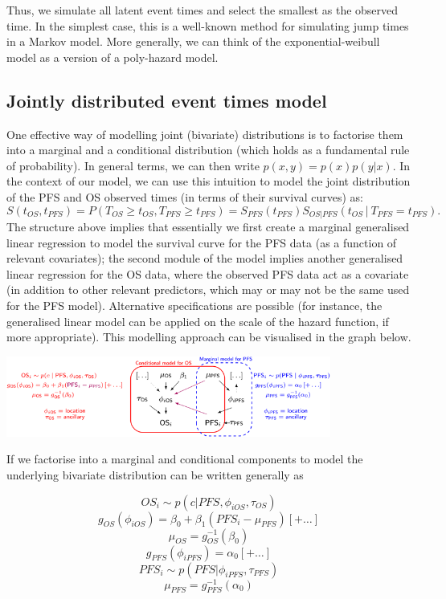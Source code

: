 \documentclass[
]{article}
\begin{document}
Thus, we simulate all latent event times and select the smallest as the
observed time. In the simplest case, this is a well-known method for
simulating jump times in a Markov model. More generally, we can think of
the exponential-weibull model as a version of a poly-hazard model.

\hypertarget{jointly-distributed-event-times-model}{%
\subsection{Jointly distributed event times
model}\label{jointly-distributed-event-times-model}}

One effective way of modelling joint (bivariate) distributions is to
factorise them into a marginal and a conditional distribution (which
holds as a fundamental rule of probability). In general terms, we can
then write \(p(x,y) = p(x)p(y | x)\). In the context of our model, we
can use this intuition to model the joint distribution of the PFS and OS
observed times (in terms of their survival curves) as: \[
S(t_{OS},t_{PFS}) = P⁡(T_{OS} \geq t_{OS}, T_{PFS} \geq t_{PFS})
= S_{PFS} (t_{PFS}) S_{OS|PFS}(t_{OS}│T_{PFS} = t_{PFS}).
\] The structure above implies that essentially we first create a
marginal generalised linear regression to model the survival curve for
the PFS data (as a function of relevant covariates); the second module
of the model implies another generalised linear regression for the OS
data, where the observed PFS data act as a covariate (in addition to
other relevant predictors, which may or may not be the same used for the
PFS model). Alternative specifications are possible (for instance, the
generalised linear model can be applied on the scale of the hazard
function, if more appropriate). This modelling approach can be
visualised in the graph below.

\includegraphics[width=0.8\textwidth,height=\textheight]{DAG.png}

If we factorise into a marginal and conditional components to model the
underlying bivariate distribution can be written generally as

\[
OS_i \sim p(c | PFS, \phi_{iOS}, \tau_{OS})
\] \[
g_{OS}(\phi_{iOS}) = \beta_0 + \beta_1 (PFS_i - \mu_{PFS})[+ \ldots]
\] \[
\mu_{OS} = g_{OS}^{-1}(\beta_0)
\] \[
g_{PFS}(\phi_{iPFS}) = \alpha_0 [+ \ldots]
\] \[
PFS_i \sim p(PFS | \phi_{iPFS}, \tau_{PFS})
\] \[
\mu_{PFS} = g_{PFS}^{-1}(\alpha_0)
\]
\end{document}
